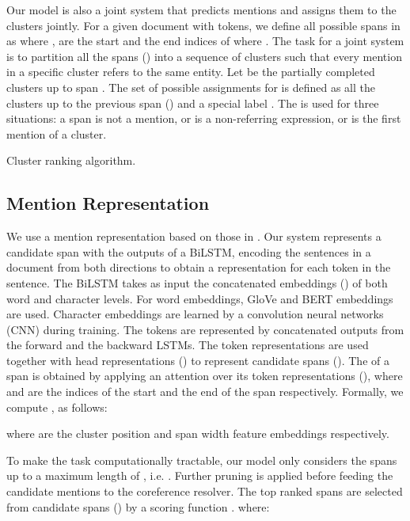 \documentclass[10pt, a4paper]{article}
\begin{document}
Our model is also a joint system that predicts  mentions and assigns them to the clusters jointly. For a given document  with  tokens, we define all possible spans in  as  where ,  are the start and the end indices of  where . 
The task for a joint system is to partition all the spans () into a sequence of clusters  such that every mention in a specific cluster  refers to the same entity. 
Let  be the partially completed clusters up to span . 
The set of possible assignments for  is defined as all the clusters up to the previous span () and a special label . 
The  is used for three situations: a span is not a mention, or is a non-referring expression, or is the first mention of a cluster. 

\begin{algorithm}[t]
\small
\SetAlgoLined
\KwInput{}
\KwOutput{}
\;
\For{ }{
\;
\For{}{

}
\;
\uIf{}{
\;
\;
\;
}\Else{
\;
\;
}
}
\caption{Cluster ranking algorithm.}\label{algorithm:att}
\end{algorithm}


\subsection{Mention Representation}
We use 
a 
mention representation 
based on those in 
\cite{lee2018higher,kantor2019bertee}.
Our system represents a candidate span with the outputs of a BiLSTM, encoding
the sentences in a document from both directions to obtain a representation for each token in the sentence. 
The BiLSTM takes as input the concatenated embeddings () of both word and character levels.
For word embeddings,  GloVe \cite{pennington2014glove} and BERT \cite{devlin2019bert} embeddings are used. 
Character embeddings are learned by a convolution neural networks (CNN) during training. 
The tokens are represented by concatenated outputs from the forward and the backward LSTMs. 
The token representations   are used together with head representations () to represent candidate spans (). The  of a span is obtained by applying an attention over its token representations (), where  and  are the indices of the start and the end of the span respectively. Formally, we compute ,  as follows:

\vspace{-10pt}
\small

\normalsize

where  are the cluster position and span width feature embeddings respectively.

To make the task computationally tractable, our model only considers the spans up to a maximum length of , i.e. . Further pruning is applied before feeding the candidate mentions to the coreference resolver. 
The top ranked  spans are selected from  candidate spans () by a scoring function . where:
\end{document}
